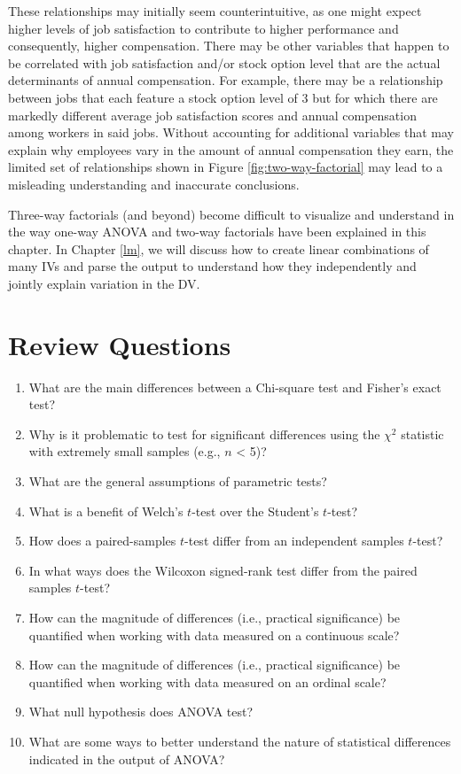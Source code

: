 \documentclass[]{book}
\begin{document}
These relationships may initially seem counterintuitive, as one might expect higher levels of job satisfaction to contribute to higher performance and consequently, higher compensation. There may be other variables that happen to be correlated with job satisfaction and/or stock option level that are the actual determinants of annual compensation. For example, there may be a relationship between jobs that each feature a stock option level of 3 but for which there are markedly different average job satisfaction scores and annual compensation among workers in said jobs. Without accounting for additional variables that may explain why employees vary in the amount of annual compensation they earn, the limited set of relationships shown in Figure \ref{fig:two-way-factorial} may lead to a misleading understanding and inaccurate conclusions.

Three-way factorials (and beyond) become difficult to visualize and understand in the way one-way ANOVA and two-way factorials have been explained in this chapter. In Chapter \ref{lm}, we will discuss how to create linear combinations of many IVs and parse the output to understand how they independently and jointly explain variation in the DV.

\hypertarget{review-questions-6}{%
\section{Review Questions}\label{review-questions-6}}

\begin{enumerate}
\def\labelenumi{\arabic{enumi}.}
\item
  What are the main differences between a Chi-square test and Fisher's exact test?
\item
  Why is it problematic to test for significant differences using the \({\chi}^2\) statistic with extremely small samples (e.g., \(n\) \textless{} 5)?
\item
  What are the general assumptions of parametric tests?
\item
  What is a benefit of Welch's \(t\)-test over the Student's \(t\)-test?
\item
  How does a paired-samples \(t\)-test differ from an independent samples \(t\)-test?
\item
  In what ways does the Wilcoxon signed-rank test differ from the paired samples \(t\)-test?
\item
  How can the magnitude of differences (i.e., practical significance) be quantified when working with data measured on a continuous scale?
\item
  How can the magnitude of differences (i.e., practical significance) be quantified when working with data measured on an ordinal scale?
\item
  What null hypothesis does ANOVA test?
\item
  What are some ways to better understand the nature of statistical differences indicated in the output of ANOVA?
\end{enumerate}
\end{document}
